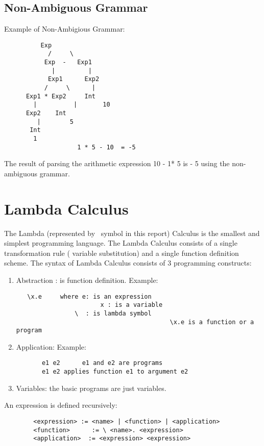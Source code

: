 \documentclass{article}
\begin{document}
\subsection{Non-Ambiguous Grammar}
Example of Non-Ambigious Grammar:
 \begin{lstlisting}
	   	  Exp
			/     \
		   Exp  -   Exp1
 		     |		   | 
		    Exp1      Exp2
		   /     \      |
      Exp1 * Exp2     Int
		|	       |       10
      Exp2    Int
		 |	      5
       Int
        1
        			1 * 5 - 10  = -5 
\end{lstlisting}
 The result of parsing the arithmetic expression 10 - 1* 5 is - 5 using the non-ambiguous grammar.

\section{Lambda Calculus}
The Lambda (represented by \ symbol in this report) Calculus is the smallest and simplest programming language. The Lambda Calculus consists of a single transformation rule ( variable substitution) and a single function definition scheme.
\newline \newline The syntax of Lambda Calculus consists of 3 programming constructs:
\begin{enumerate}
  \item Abstraction : is function definition.
  \newline Example:
   \begin{lstlisting}
   \x.e 	where e: is an expression
			           x : is a variable
				\  : is lambda symbol
                                          \x.e is a function or a program 
\end{lstlisting}
  \item Application: 
  \newline Example:
  \begin{lstlisting}
       e1 e2      e1 and e2 are programs
       e1 e2 applies function e1 to argument e2
\end{lstlisting}
  \item Variables: the basic programs are just variables.
  \end{enumerate}
  An expression is defined recursively: 
  \begin{lstlisting}
        <expression> := <name> | <function> | <application>
        <function>      := \ <name>. <expression>
        <application>  := <expression> <expression>
\end{lstlisting}
\end{document}
